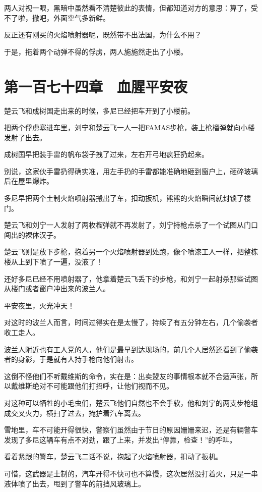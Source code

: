 两人对视一眼，黑暗中虽然看不清楚彼此的表情，但都知道对方的意思：算了，受不了啦，撤吧，外面空气多新鲜。

反正还有刚买的火焰喷射器呢，既然带不出法国，为什么不用？

于是，拖着两个动弹不得的俘虏，两人施施然走出了小楼。

\section{第一百七十四章　血腥平安夜}

楚云飞和成树国走出来的时候，多尼已经把车开到了小楼前。

把两个俘虏塞进车里，刘宁和楚云飞一人一把FAMAS步枪，装上枪榴弹就向小楼发射了出去。

成树国早把装手雷的帆布袋子拽了过来，左右开弓地疯狂扔起来。

别说，这家伙手雷扔得确实准，用左手扔的手雷都能准确地砸到窗户上，砸碎玻璃后在屋里爆炸。

多尼早把两个土制火焰喷射器搬出了车，扣动扳机，熊熊的火焰瞬间就封锁了楼门。

楚云飞和刘宁一人发射了两枚榴弹就不再发射了，刘宁持枪点杀了一个试图从门口闯出的裸体汉子。

楚云飞则是放下步枪，抱着另一个火焰喷射器到处跑，像个喷漆工人一样，把整栋楼从上到下喷了一遍，没液了！

还好多尼已经不用喷射器了，他拿着楚云飞丢下的步枪，和刘宁一起射杀那些试图从楼门或者窗户冲出来的波兰人。

平安夜里，火光冲天！

对这时的波兰人而言，时间过得实在是太慢了，持续了有五分钟左右，几个偷袭者收工走人。

波兰人附近也有工人党的人，他们是最早到达现场的，前几个人居然还看到了偷袭者的身影，于是就有人持手枪向他们射击。

这倒不怪他们不听戴维斯的命令，实在是：出卖盟友的事情根本就不合适声张，所以戴维斯绝对不可能跟他们打招呼，让他们视而不见。

对这种可以牺牲的小毛虫们，楚云飞他们自然也不会手软，他和刘宁的两支步枪组成交叉火力，横扫了过去，掩护着汽车离去。

雪地里，车不可能开得很快，警察们虽然由于节日的原因姗姗来迟，还是有辆警车发现了多尼这辆车有点不对劲，跟了上来，并发出“停靠，检查！”的呼叫。

看着紧跟的警车，楚云飞二话不说，抱起了火焰喷射器，扣动了扳机。

可惜，这武器是土制的，汽车开得不快可也不算慢，这次居然没打着火，只是一串液体喷了出去，甩到了警车的前挡风玻璃上。


